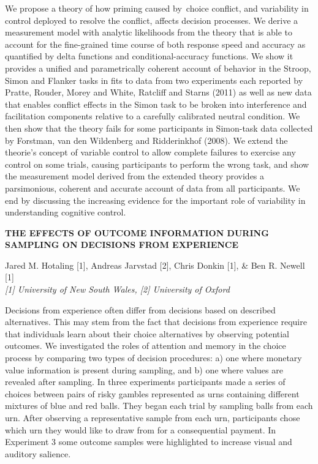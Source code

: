 \documentclass[]{article}
\begin{document}
We propose a theory of how priming caused by~choice conflict, and
variability in control deployed to resolve the conflict, affects
decision processes. We derive a measurement model with analytic
likelihoods from the theory that is able to account for the fine-grained
time course of both response speed and accuracy as quantified by delta
functions and conditional-accuracy functions. We show it provides a
unified and parametrically coherent account of behavior in the Stroop,
Simon and Flanker tasks in fits to data from two experiments each
reported by Pratte, Rouder, Morey and White, Ratcliff and Starns (2011)
as well as new data that enables conflict effects in the Simon task to
be broken into interference and facilitation components relative to a
carefully calibrated neutral condition. We then show that the theory
fails for some participants in Simon-task data collected by Forstman,
van den Wildenberg and Ridderinkhof (2008). We extend the theorie's
concept of variable control to allow complete failures to exercise any
control on some trials, causing participants to perform the wrong task,
and show the measurement model derived from the extended theory provides
a parsimonious, coherent and accurate account of data from all
participants. We end by discussing the increasing evidence for the
important role of variability in understanding cognitive control.\\
\pagebreak  

\textbf{THE EFFECTS OF OUTCOME INFORMATION DURING SAMPLING ON DECISIONS
FROM EXPERIENCE}

Jared M. Hotaling {[}1{]}, Andreas Jarvstad {[}2{]}, Chris Donkin
{[}1{]}, \& Ben R. Newell {[}1{]}\\
\emph{{[}1{]} University of New South Wales, {[}2{]} University of
Oxford}

Decisions from experience often differ from decisions based on described
alternatives. This may stem from the fact that decisions from experience
require that individuals learn about their choice alternatives by
observing potential outcomes. We investigated the roles of attention and
memory in the choice process by comparing two types of decision
procedures: a) one where monetary value information is present during
sampling, and b) one where values are revealed after sampling. In three
experiments participants made a series of choices between pairs of risky
gambles represented as urns containing different mixtures of blue and
red balls. They began each trial by sampling balls from each urn. After
observing a representative sample from each urn, participants chose
which urn they would like to draw from for a consequential payment. In
Experiment 3 some outcome samples were highlighted to increase visual
and auditory salience.
\end{document}
